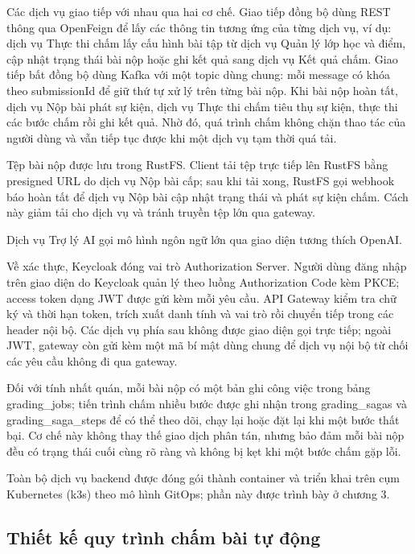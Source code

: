 \documentclass[../BTL.tex]{subfiles}
\begin{document}
Các dịch vụ giao tiếp với nhau qua hai cơ chế. Giao tiếp đồng bộ dùng REST thông qua OpenFeign để lấy các thông tin tương ứng của từng dịch vụ, ví dụ: dịch vụ Thực thi chấm lấy cấu hình bài tập từ dịch vụ Quản lý lớp học và điểm, cập nhật trạng thái bài nộp hoặc ghi kết quả sang dịch vụ Kết quả chấm. Giao tiếp bất đồng bộ dùng Kafka với một topic dùng chung: mỗi message có khóa theo submissionId để giữ thứ tự xử lý trên từng bài nộp. Khi bài nộp hoàn tất, dịch vụ Nộp bài phát sự kiện, dịch vụ Thực thi chấm tiêu thụ sự kiện, thực thi các bước chấm rồi ghi kết quả. Nhờ đó, quá trình chấm không chặn thao tác của người dùng và vẫn tiếp tục được khi một dịch vụ tạm thời quá tải.

Tệp bài nộp được lưu trong RustFS. Client tải tệp trực tiếp lên RustFS bằng presigned URL do dịch vụ Nộp bài cấp; sau khi tải xong, RustFS gọi webhook báo hoàn tất để dịch vụ Nộp bài cập nhật trạng thái và phát sự kiện chấm. Cách này giảm tải cho dịch vụ và tránh truyền tệp lớn qua gateway.

Dịch vụ Trợ lý AI gọi mô hình ngôn ngữ lớn qua giao diện tương thích OpenAI.

Về xác thực, Keycloak đóng vai trò Authorization Server. Người dùng đăng nhập trên giao diện do Keycloak quản lý theo luồng Authorization Code kèm PKCE; access token dạng JWT được gửi kèm mỗi yêu cầu. API Gateway kiểm tra chữ ký và thời hạn token, trích xuất danh tính và vai trò rồi chuyển tiếp trong các header nội bộ. Các dịch vụ phía sau không được giao diện gọi trực tiếp; ngoài JWT, gateway còn gửi kèm một mã bí mật dùng chung để dịch vụ nội bộ từ chối các yêu cầu không đi qua gateway.

Đối với tính nhất quán, mỗi bài nộp có một bản ghi công việc trong bảng \textnormal{grading\_jobs}; tiến trình chấm nhiều bước được ghi nhận trong \textnormal{grading\_sagas} và \textnormal{grading\_saga\_steps} để có thể theo dõi, chạy lại hoặc đặt lại khi một bước thất bại. Cơ chế này không thay thế giao dịch phân tán, nhưng bảo đảm mỗi bài nộp đều có trạng thái cuối cùng rõ ràng và không bị kẹt khi một bước chấm gặp lỗi.

Toàn bộ dịch vụ backend được đóng gói thành container và triển khai trên cụm Kubernetes (k3s) theo mô hình GitOps; phần này được trình bày ở chương 3.

\subsection{Thiết kế quy trình chấm bài tự động}
\end{document}
